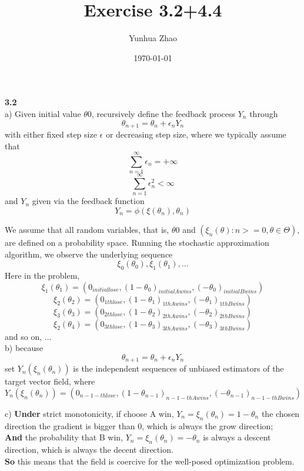 \documentclass{article}
\title{Exercise 3.2+4.4}
\author{Yunhua Zhao}
\date{\today}
\begin{document}
\maketitle

\textbf {3.2}  \\
a) Given initial value $\theta0$, recursively define the feedback process ${Y_n}$ through $$ \theta_{n+1} = \theta_n+\epsilon_nY_n $$
with either fixed step size $\epsilon$ or decreasing step size, where we typically assume that 
$$ \sum_{n=1}^{\infty}\epsilon_n = +\infty $$
$$ \sum_{n=1}^{\infty}\epsilon_n^2 < \infty $$
and $Y_n$ given via the feedback function
$$ Y_n = \phi(\xi(\theta_n),\theta_n) $$
 
We assume that all random variables, that is, $\theta0$ and $ ({\xi_n(\theta):n>=0, \theta\in\Theta}) $, are defined on a probability
space. Running the stochastic approximation algorithm, we observe the underlying
sequence
$$ \xi_0(\theta_0), \xi_1(\theta_1),... $$ 
Here in the problem, 
$$ \xi_1(\theta_1) = (0_{initial lose},(1-\theta_{0})_{initial A wins}, (-\theta_{0})_{initial B wins}) $$
$$ \xi_2(\theta_2) = (0_{1th lose},(1-\theta_{1})_{1th A wins}, (-\theta_{1})_{1th B wins}) $$
$$ \xi_3(\theta_3) = (0_{2th lose},(1-\theta_{2})_{2th A wins}, (-\theta_{2})_{2th B wins}) $$
$$ \xi_2(\theta_4) = (0_{3th lose},(1-\theta_{3})_{3th A wins}, (-\theta_{3})_{3th B wins}) $$
and so on, ...  \\

b) because $$ \theta_{n+1} = \theta_n+\epsilon_nY_n $$ 
set $Y_n(\xi_n(\theta_n))$ is the independent sequences of unbiased estimators of the target vector field, where
$$Y_n(\xi_n(\theta_n)) = (0_{n-1-th lose}, (1-\theta_{n-1})_{n-1-th A wins}, (-\theta_{n-1})_{n-1-th B wins}) $$


c) \textbf{Under} strict monotonicity, if choose A win, $Y_n=\xi_n(\theta_n) = 1-\theta_n$ the chosen direction the gradient is bigger than 0, which is always the grow direction;  \\
\textbf{And} the probability that B win,  $Y_n=\xi_n(\theta_n) = -\theta_n$ is always a descent direction, which is always the decent direction. \\
\textbf{So} this means that the field is coercive for the well-posed optimization problem.  \\
\end{document}
